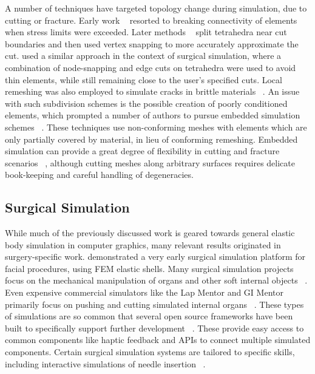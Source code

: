 A number of techniques have targeted topology change during
simulation, due to cutting or fracture. Early work
~\citep{TerzoF:1988b} resorted to breaking connectivity of elements
when stress limits were exceeded. Later methods ~\citep{NienhS:2001}
split tetrahedra near cut boundaries and then used vertex snapping to
more accurately approximate the cut. \citet{SteinHGS:2006} used a
similar approach in the context of surgical simulation, where a
combination of node-snapping and edge cuts on tetrahedra were used to
avoid thin elements, while still remaining close to the user's
specified cuts. Local remeshing was also employed to simulate cracks
in brittle materials ~\citep{OBriH:1999}. An issue with such
subdivision schemes is the possible creation of poorly conditioned
elements, which prompted a number of authors to pursue embedded
simulation schemes ~\citep{MolinBF:2004,TeranSBNLF:2005}. These
techniques use non-conforming meshes with elements which are only
partially covered by material, in lieu of conforming
remeshing. Embedded simulation can provide a great degree of
flexibility in cutting and fracture scenarios ~\citep{SifakDF:2007},
although cutting meshes along arbitrary surfaces requires delicate
book-keeping and careful handling of degeneracies.


\subsection{Surgical Simulation}
While much of the previously discussed work is geared towards general
elastic body simulation in computer graphics, many relevant results
originated in surgery-specific work. 
\citet{PiepeLR:1995} demonstrated a very early surgical simulation
platform for facial procedures, using FEM elastic shells.  Many
surgical simulation projects focus on the mechanical manipulation of
organs and other soft internal objects
~\citep{NienhS:2001,KimCDS:2007}. Even expensive commercial simulators
like the Lap Mentor and GI Mentor primarily focus on pushing and
cutting simulated internal organs
~\citep{SUSAC:2002--2014b,SUSAC:2002--2014}. These types of simulations
are so common that several open source frameworks have been built to
specifically support further development
~\citep{AllarCFBPDDGo:2007,CavusGT:2006}. These provide easy access to
common components like haptic feedback and APIs to connect multiple
simulated components. Certain surgical simulation systems are tailored
to specific skills, including interactive simulations of needle
insertion ~\citep{ChentARCHGSO:2009}.

